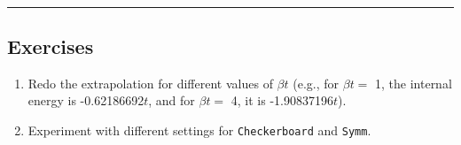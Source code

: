 \documentclass[11pt]{article}
\providecommand{\tightlist}{%
      \setlength{\itemsep}{0pt}\setlength{\parskip}{0pt}}
\begin{document}
    \begin{center}
    \end{center}
    { \hspace*{\fill} \\}
    
    \begin{center}\rule{0.5\linewidth}{\linethickness}\end{center}

\hypertarget{exercises}{%
\subsection{Exercises}\label{exercises}}

\begin{enumerate}
\def\labelenumi{\arabic{enumi}.}
\tightlist
\item
  Redo the extrapolation for different values of \(\beta t\) (e.g., for
  \(\beta t =\) 1, the internal energy is -0.62186692\(t\), and for
  \(\beta t =\) 4, it is -1.90837196\(t\)).
\item
  Experiment with different settings for \texttt{Checkerboard} and
  \texttt{Symm}.
\end{enumerate}


    
    
    
\end{document}
